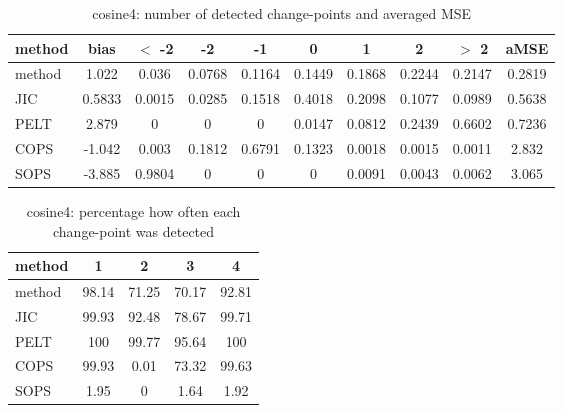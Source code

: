 \begin{table}[ht]
\centering
\begin{tabular}{l|c|ccccccc|c}
  \hline
method & bias & $<$ -2 & -2 & -1 & 0 & 1 & 2 & $>$ 2 & aMSE \\ 
  \hline
method & 1.022 & 0.036 & 0.0768 & 0.1164 & 0.1449 & 0.1868 & 0.2244 & 0.2147 & 0.2819 \\ 
  JIC & 0.5833 & 0.0015 & 0.0285 & 0.1518 & 0.4018 & 0.2098 & 0.1077 & 0.0989 & 0.5638 \\ 
  PELT & 2.879 &     0 &     0 &     0 & 0.0147 & 0.0812 & 0.2439 & 0.6602 & 0.7236 \\ 
  COPS & -1.042 & 0.003 & 0.1812 & 0.6791 & 0.1323 & 0.0018 & 0.0015 & 0.0011 & 2.832 \\ 
  SOPS & -3.885 & 0.9804 &     0 &     0 &     0 & 0.0091 & 0.0043 & 0.0062 & 3.065 \\ 
   \hline
\end{tabular}
\caption{cosine4: number of detected change-points and averaged MSE} 
\label{tab:cosine4Njumps}
\end{table}
\begin{table}[ht]
\centering
\begin{tabular}{l|cccc}
  \hline
method & 1 & 2 & 3 & 4 \\ 
  \hline
method &  98.14 &  71.25 &  70.17 &  92.81 \\ 
  JIC &  99.93 &  92.48 &  78.67 &  99.71 \\ 
  PELT &    100 &  99.77 &  95.64 &    100 \\ 
  COPS &  99.93 &   0.01 &  73.32 &  99.63 \\ 
  SOPS &   1.95 &      0 &   1.64 &   1.92 \\ 
   \hline
\end{tabular}
\caption{cosine4: percentage how often each change-point was detected} 
\label{tab:cosine4Detections}
\end{table}
